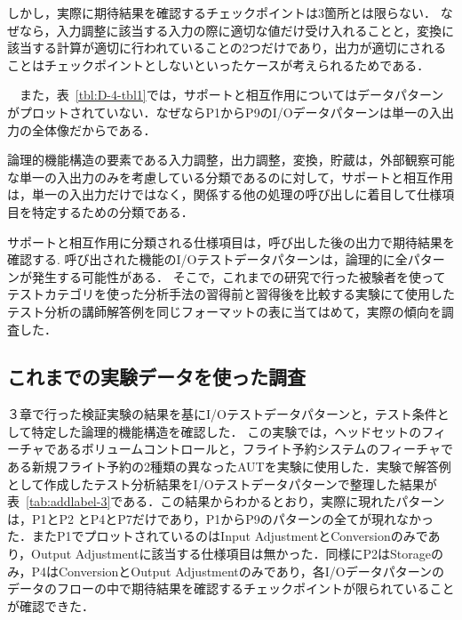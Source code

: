 しかし，実際に期待結果を確認するチェックポイントは3箇所とは限らない．
なぜなら，入力調整に該当する入力の際に適切な値だけ受け入れることと，変換に該当する計算が適切に行われていることの2つだけであり，出力が適切にされることはチェックポイントとしないといったケースが考えられるためである．

　また，表~\ref{tbl:D-4-tbl1}では，サポートと相互作用についてはデータパターンがプロットされていない．なぜならP1からP9のI/Oデータパターンは単一の入出力の全体像だからである．

論理的機能構造の要素である入力調整，出力調整，変換，貯蔵は，外部観察可能な単一の入出力のみを考慮している分類であるのに対して，サポートと相互作用は，単一の入出力だけではなく，関係する他の処理の呼び出しに着目して仕様項目を特定するための分類である．

サポートと相互作用に分類される仕様項目は，呼び出した後の出力で期待結果を確認する.
呼び出された機能のI/Oテストデータパターンは，論理的に全パターンが発生する可能性がある．
そこで，これまでの研究で行った被験者を使ってテストカテゴリを使った分析手法の習得前と習得後を比較する実験にて使用したテスト分析の講師解答例を同じフォーマットの表に当てはめて，実際の傾向を調査した．

\subsection{これまでの実験データを使った調査}
３章で行った検証実験の結果を基にI/Oテストデータパターンと，テスト条件として特定した論理的機能構造を確認した．
この実験では，ヘッドセットのフィーチャであるボリュームコントロールと，フライト予約システムのフィーチャである新規フライト予約の2種類の異なったAUTを実験に使用した．実験で解答例として作成したテスト分析結果をI/Oテストデータパターンで整理した結果が表~\ref{tab:addlabel-3}である．この結果からわかるとおり，実際に現れたパターンは，P1とP2 とP4とP7だけであり，P1からP9のパターンの全てが現れなかった．またP1でプロットされているのはInput AdjustmentとConversionのみであり，Output Adjustmentに該当する仕様項目は無かった．同様にP2はStorageのみ，P4はConversionとOutput Adjustmentのみであり，各I/Oデータパターンのデータのフローの中で期待結果を確認するチェックポイントが限られていることが確認できた．

